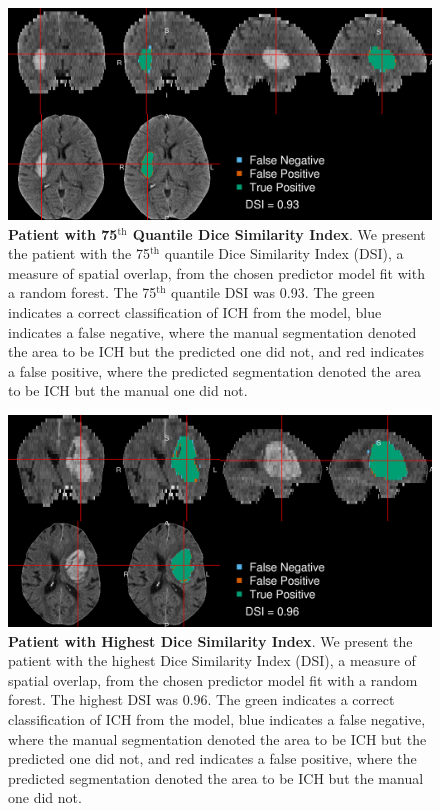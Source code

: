 \documentclass{elsarticle_nonatbib}\usepackage[]{graphicx}\usepackage[]{color}
\begin{document}
 \begin{figure}
\centering
\includegraphics[width=\linewidth,keepaspectratio]{figures/Long/Reseg_Figure_DSI_Quantile_075_native.png}
\caption{{\bf Patient with  75$^{\text{th}}$ Quantile Dice Similarity Index}. We present the patient with the 75$^{\text{th}}$ quantile Dice Similarity Index (DSI), a measure of spatial overlap, from the chosen predictor model fit with a random forest.  The 75$^{\text{th}}$ quantile DSI was 0.93. The green indicates a correct classification of ICH from the model, blue indicates a false negative, where the manual segmentation denoted the area to be ICH but the predicted one did not, and red indicates a false positive, where the predicted segmentation denoted the area to be ICH but the manual one did not. }
\label{fig:dice_img75}
\end{figure}

 \begin{figure}
\centering
\includegraphics[width=\linewidth,keepaspectratio]{figures/Long/Reseg_Figure_DSI_Quantile_100_native.png}
\caption{{\bf Patient with  Highest Dice Similarity Index}. We present the patient with the highest Dice Similarity Index (DSI), a measure of spatial overlap, from the chosen predictor model fit with a random forest.  The highest DSI was 0.96. The green indicates a correct classification of ICH from the model, blue indicates a false negative, where the manual segmentation denoted the area to be ICH but the predicted one did not, and red indicates a false positive, where the predicted segmentation denoted the area to be ICH but the manual one did not. }
\label{fig:dice_img100}
\end{figure}
\end{document}
